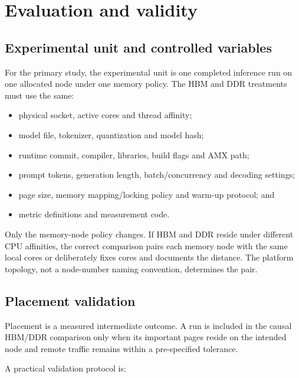 \section{Evaluation and validity}
\label{sec:methodology}

\subsection{Experimental unit and controlled variables}

For the primary study, the experimental unit is one completed inference
run on one allocated node under one memory policy.  The HBM and DDR
treatments must use the same:

\begin{itemize}
  \item physical socket, active cores and thread affinity;
  \item model file, tokenizer, quantization and model hash;
  \item runtime commit, compiler, libraries, build flags and AMX path;
  \item prompt tokens, generation length, batch/concurrency and decoding
        settings;
  \item page size, memory mapping/locking policy and warm-up protocol;
        and
  \item metric definitions and measurement code.
\end{itemize}

Only the memory-node policy changes.  If HBM and DDR reside under
different CPU affinities, the correct comparison pairs each memory node
with the same local cores or deliberately fixes cores and documents the
distance.  The platform topology, not a node-number naming convention,
determines the pair.

\subsection{Placement validation}

Placement is a measured intermediate outcome.  A run is included in the
causal HBM/DDR comparison only when its important pages reside on the
intended node and remote traffic remains within a pre-specified
tolerance.

A practical validation protocol is:

